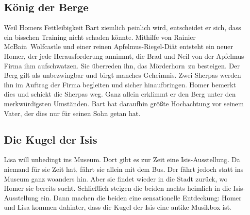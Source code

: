 \subsection{König der Berge}\label{5F16}
Weil Homers Fettleibigkeit Bart ziemlich peinlich wird, entscheidet er sich, dass ein bisschen Training nicht schaden könnte. Mithilfe von Rainier \glqq McBain\grqq\ Wolfcastle und einer reinen Apfelmus-Riegel-Diät entsteht ein neuer Homer, der jede Herausforderung annimmt, die Brad und Neil von der Apfelmus-Firma ihm aufschwatzen. Sie überreden ihn, das \glqq Mörderhorn\grqq\ zu besteigen. Der Berg gilt als unbezwingbar und birgt manches Geheimnis. Zwei Sherpas werden ihn im Auftrag der Firma begleiten und sicher hinaufbringen. Homer bemerkt dies und schickt die Sherpas weg. Ganz allein erklimmt er den Berg unter den merkwürdigsten Umständen. Bart hat daraufhin größte Hochachtung vor seinem Vater, der dies nur für seinen Sohn getan hat.

	
	
\subsection{Die Kugel der Isis}\label{5F17}
Lisa will unbedingt ins Museum. Dort gibt es zur Zeit eine Isis-Ausstellung. Da niemand für sie Zeit hat, fährt sie allein mit dem Bus. Der fährt jedoch statt ins Museum ganz woanders hin. Aber sie findet wieder in die Stadt zurück, wo Homer sie bereits sucht. Schließlich steigen die beiden nachts heimlich in die Isis-Ausstellung ein. Dann machen die beiden eine sensationelle Entdeckung: Homer und Lisa kommen dahinter, dass die Kugel der Isis eine antike Musikbox ist.


